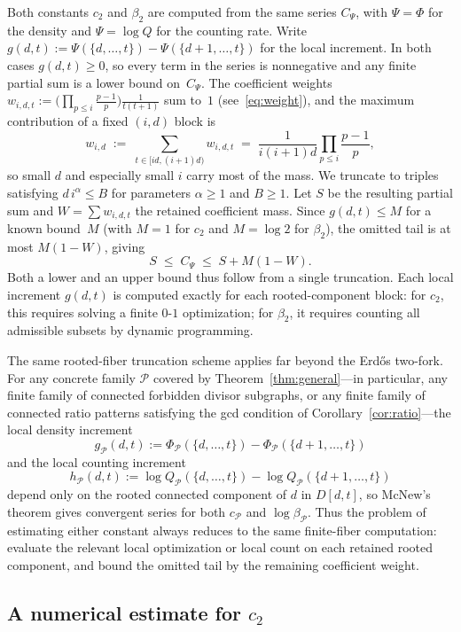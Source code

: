 \documentclass[11pt]{amsart}
\begin{document}
Both constants \(c_2\) and \(\beta_2\) are computed from the same series \(C_\Psi\), with \(\Psi=\Phi\) for the density and \(\Psi=\log Q\) for the counting rate. Write \(g(d,t):=\Psi(\{d,\dots,t\})-\Psi(\{d+1,\dots,t\})\) for the local increment. In both cases \(g(d,t)\ge 0\), so every term in the series is nonnegative and any finite partial sum is a lower bound on~\(C_\Psi\). The coefficient weights \(w_{i,d,t}:=\bigl(\prod_{p\le i}\tfrac{p-1}{p}\bigr)\tfrac{1}{t(t+1)}\) sum to~\(1\) (see~\eqref{eq:weight}), and the maximum contribution of a fixed \((i,d)\) block is
\[
w_{i,d}\;:=\;\sum_{t\in[id,(i+1)d)} w_{i,d,t}\;=\;\frac{1}{i(i+1)d}\prod_{p\le i}\frac{p-1}{p},
\]
so small \(d\) and especially small \(i\) carry most of the mass. We truncate to triples satisfying \(d\,i^{\alpha}\le B\) for parameters \(\alpha\ge 1\) and \(B\ge 1\). Let \(S\) be the resulting partial sum and \(W=\sum w_{i,d,t}\) the retained coefficient mass. Since \(g(d,t)\le M\) for a known bound~\(M\) (with \(M=1\) for \(c_2\) and \(M=\log 2\) for \(\beta_2\)), the omitted tail is at most \(M(1-W)\), giving
\[
S\;\le\; C_\Psi\;\le\; S + M(1-W).
\]
Both a lower and an upper bound thus follow from a single truncation. Each local increment \(g(d,t)\) is computed exactly for each rooted-component block: for \(c_2\), this requires solving a finite \(0\text{-}1\) optimization; for \(\beta_2\), it requires counting all admissible subsets by dynamic programming.

The same rooted-fiber truncation scheme applies far beyond the Erd\H{o}s two-fork. For any concrete family \(\mathcal{P}\) covered by Theorem~\ref{thm:general}---in particular, any finite family of connected forbidden divisor subgraphs, or any finite family of connected ratio patterns satisfying the gcd condition of Corollary~\ref{cor:ratio}---the local density increment
\[
g_{\mathcal{P}}(d,t):=\Phi_{\mathcal{P}}(\{d,\dots,t\})-\Phi_{\mathcal{P}}(\{d+1,\dots,t\})
\]
and the local counting increment
\[
h_{\mathcal{P}}(d,t):=\log Q_{\mathcal{P}}(\{d,\dots,t\})-\log Q_{\mathcal{P}}(\{d+1,\dots,t\})
\]
depend only on the rooted connected component of \(d\) in \(D[d,t]\), so McNew's theorem gives convergent series for both \(c_{\mathcal{P}}\) and \(\log\beta_{\mathcal{P}}\). Thus the problem of estimating either constant always reduces to the same finite-fiber computation: evaluate the relevant local optimization or local count on each retained rooted component, and bound the omitted tail by the remaining coefficient weight.

\subsection{A numerical estimate for \(c_2\)}
\end{document}

